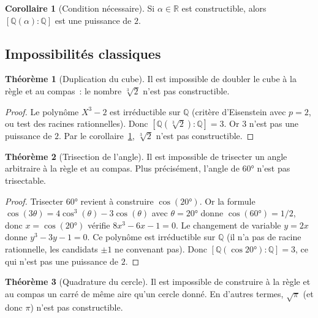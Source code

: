 \documentclass[12pt,a4paper,openany]{book}
\theoremstyle{definition}
\newtheorem{theoreme}{Théorème}[chapter]
\newtheorem{corollaire}{Corollaire}[chapter]
\newcommand{\Q}{\mathbb{Q}}
\newcommand{\R}{\mathbb{R}}
\begin{document}
\begin{corollaire}[Condition nécessaire]\label{cor:condition-necessaire-constr}
Si $\alpha \in \R$ est constructible, alors $[\Q(\alpha):\Q]$ est une
puissance de $2$.
\end{corollaire}

\subsection{Impossibilités classiques}\label{ssec:impossibilites}

\begin{theoreme}[Duplication du cube]\label{thm:duplication-cube}
Il est impossible de doubler le cube à la règle et au compas~: le nombre
$\sqrt[3]{2}$ n'est pas constructible.
\end{theoreme}

\begin{proof}
Le polynôme $X^3 - 2$ est irréductible sur $\Q$ (critère d'Eisenstein avec
$p = 2$, ou test des racines rationnelles). Donc
$[\Q(\sqrt[3]{2}):\Q] = 3$. Or $3$ n'est pas une puissance de $2$. Par le
corollaire~\ref{cor:condition-necessaire-constr}, $\sqrt[3]{2}$ n'est pas
constructible.
\end{proof}

\begin{theoreme}[Trisection de l'angle]\label{thm:trisection-angle}
Il est impossible de trisecter un angle arbitraire à la règle et au compas.
Plus précisément, l'angle de $60°$ n'est pas trisectable.
\end{theoreme}

\begin{proof}
Trisecter $60°$ revient à construire $\cos(20°)$. Or la formule
$\cos(3\theta) = 4\cos^3(\theta) - 3\cos(\theta)$ avec $\theta = 20°$
donne $\cos(60°) = 1/2$, donc $x = \cos(20°)$ vérifie
$8x^3 - 6x - 1 = 0$. Le changement de variable $y = 2x$ donne
$y^3 - 3y - 1 = 0$. Ce polynôme est irréductible sur $\Q$ (il n'a pas de
racine rationnelle, les candidats $\pm 1$ ne convenant pas). Donc
$[\Q(\cos 20°):\Q] = 3$, ce qui n'est pas une puissance de $2$.
\end{proof}

\begin{theoreme}[Quadrature du cercle]\label{thm:quadrature-cercle}
Il est impossible de construire à la règle et au compas un carré de même aire
qu'un cercle donné. En d'autres termes, $\sqrt{\pi}$ (et donc $\pi$) n'est
pas constructible.
\end{theoreme}
\end{document}
